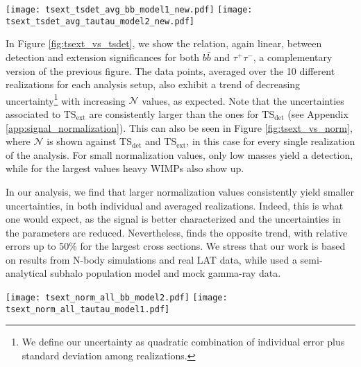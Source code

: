 \documentclass[%
 reprint,
nofootinbib,
 amsmath,amssymb,
 aps,
]{revtex4-2}
\begin{document}
\begin{figure*}[!ht]
\centering
\texttt{[image: tsext\_tsdet\_avg\_bb\_model1\_new.pdf]}
\hfill
\texttt{[image: tsext\_tsdet\_avg\_tautau\_model2\_new.pdf]}
\caption{{  Detection $\mathrm{TS_{det}}$ as a function of extension detection} $\mathrm{TS_{ext}}$ significances for the ($b\bar{b}$, $\mathrm{10^4~M_{\odot}}$) and the ($\tau^+\tau^-$, $\mathrm{10^7~M_{\odot}}$) models (left and right panels, respectively). Vertical and horizontal lines mark, respectively, $\mathrm{TS_{ext}}=25$ and $\mathrm{TS_{det}}=25$. Each point is averaged across the 10 different realizations of the same setup.}
\label{fig:tsext_vs_tsdet}
\end{figure*}

In Figure \ref{fig:tsext_vs_tsdet}, we show the relation, again linear, between detection and extension significances for both $b\bar{b}$ and $\tau^+\tau^-$, a complementary version of the previous figure. The data points, averaged over the 10 different realizations for each analysis setup, also exhibit a trend of decreasing uncertainty\footnote{We define our uncertainty as quadratic combination of individual error plus standard deviation among realizations.} with increasing $\mathcal{N}$ values, as expected. Note that the uncertainties associated to $\mathrm{TS_{ext}}$ are consistently larger than the ones for $\mathrm{TS_{det}}$ (see Appendix \ref{app:signal_normalization}). This can also be seen in Figure \ref{fig:tsext_vs_norm}, where $\mathcal{N}$ is shown against $\mathrm{TS_{det}}$ and $\mathrm{TS_{ext}}$, in this case for every single realization of the analysis. For small normalization values, only low masses yield a detection, while for the largest values heavy WIMPs also show up.

In our analysis, we find that larger normalization values consistently yield smaller uncertainties, in both individual and averaged realizations. Indeed, this is what one would expect, as the signal is better characterized and the uncertainties in the parameters are reduced. Nevertheless, \cite{Mauro2020} finds the opposite trend, with relative errors up to 50\% for the largest cross sections. We stress that our work is based on results from N-body simulations and real LAT data, while \cite{Mauro2020} used a semi-analytical subhalo population model and mock gamma-ray data.

\begin{figure*}[!ht]
\centering
\texttt{[image: tsext\_norm\_all\_bb\_model2.pdf]}
\hfill
\texttt{[image: tsext\_norm\_all\_tautau\_model1.pdf]}
\caption{Normalization of the source (J-factor $\times~\langle\sigma v\rangle$) versus the extension significance $\mathrm{TS_{ext}}$, for the ($b\bar{b}$, $\mathrm{10^7~M_{\odot}}$) and the ($\tau^+\tau^-$, $\mathrm{10^4~M_{\odot}}$) models, in all realizations. Vertical, black line marks $\mathrm{TS_{ext}}=25$.}
\label{fig:tsext_vs_norm}
\end{figure*}
\end{document}
